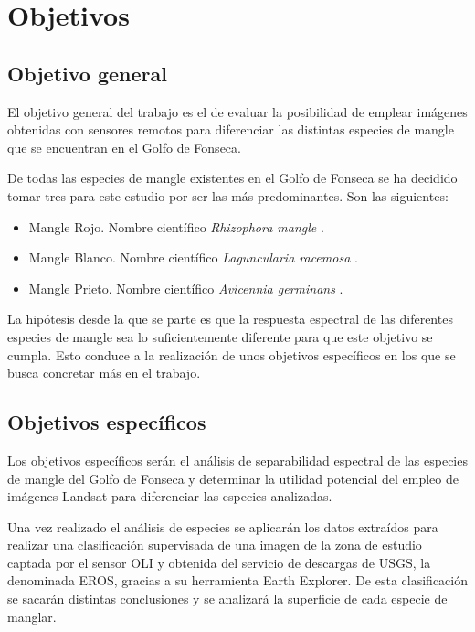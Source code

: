 \section{Objetivos}
\subsection{Objetivo general}
El objetivo general del trabajo es el de evaluar la posibilidad de emplear imágenes obtenidas con sensores remotos para diferenciar las distintas especies de mangle que se encuentran en el Golfo de Fonseca.\Sep

De todas las especies de mangle existentes en el Golfo de Fonseca se ha decidido tomar tres para este estudio por ser las más predominantes. Son las siguientes:

\begin{itemize}
	\item Mangle Rojo. Nombre científico \textit{Rhizophora mangle} \citep{JimenezRhizophora}.
	\item Mangle Blanco. Nombre científico \textit{Laguncularia racemosa} \citep{JimenezLaguncularia}.
	\item Mangle Prieto. Nombre científico \textit{Avicennia germinans} \citep{JimenezAvicennia}.
\end{itemize}

La hipótesis desde la que se parte es que la respuesta espectral de las diferentes especies de mangle sea lo suficientemente diferente para que este objetivo se cumpla. Esto conduce a la realización de unos objetivos específicos en los que se busca concretar más en el trabajo.

\subsection{Objetivos específicos}
Los objetivos específicos serán el análisis de separabilidad espectral de las especies de mangle del Golfo de Fonseca y determinar la utilidad potencial del empleo de imágenes Landsat para diferenciar las especies analizadas.\Sep

Una vez realizado el análisis de especies se aplicarán los datos extraídos para realizar una clasificación supervisada de una imagen de la zona de estudio captada por el sensor \ac{OLI} y obtenida del servicio de descargas de \ac{USGS}, la denominada \ac{EROS}, gracias a su herramienta Earth Explorer. De esta clasificación se sacarán distintas conclusiones y se analizará la superficie de cada especie de manglar.\Sep

